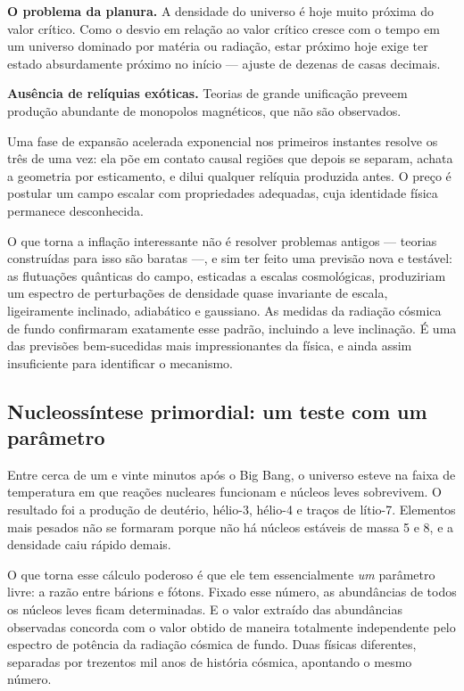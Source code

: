 \documentclass[11pt,a4paper]{article}
\begin{document}
\textbf{O problema da planura.} A densidade do universo é hoje muito próxima do valor crítico. Como o desvio em relação ao valor crítico cresce com o tempo em um universo dominado por matéria ou radiação, estar próximo hoje exige ter estado absurdamente próximo no início --- ajuste de dezenas de casas decimais.

\textbf{Ausência de relíquias exóticas.} Teorias de grande unificação preveem produção abundante de monopolos magnéticos, que não são observados.

Uma fase de expansão acelerada exponencial nos primeiros instantes resolve os três de uma vez: ela põe em contato causal regiões que depois se separam, achata a geometria por esticamento, e dilui qualquer relíquia produzida antes. O preço é postular um campo escalar com propriedades adequadas, cuja identidade física permanece desconhecida.

O que torna a inflação interessante não é resolver problemas antigos --- teorias construídas para isso são baratas ---, e sim ter feito uma previsão nova e testável: as flutuações quânticas do campo, esticadas a escalas cosmológicas, produziriam um espectro de perturbações de densidade quase invariante de escala, ligeiramente inclinado, adiabático e gaussiano. As medidas da radiação cósmica de fundo confirmaram exatamente esse padrão, incluindo a leve inclinação. É uma das previsões bem-sucedidas mais impressionantes da física, e ainda assim insuficiente para identificar o mecanismo.

\subsection*{Nucleossíntese primordial: um teste com um parâmetro}

Entre cerca de um e vinte minutos após o Big Bang, o universo esteve na faixa de temperatura em que reações nucleares funcionam e núcleos leves sobrevivem. O resultado foi a produção de deutério, hélio-3, hélio-4 e traços de lítio-7. Elementos mais pesados não se formaram porque não há núcleos estáveis de massa 5 e 8, e a densidade caiu rápido demais.

O que torna esse cálculo poderoso é que ele tem essencialmente \emph{um} parâmetro livre: a razão entre bárions e fótons. Fixado esse número, as abundâncias de todos os núcleos leves ficam determinadas. E o valor extraído das abundâncias observadas concorda com o valor obtido de maneira totalmente independente pelo espectro de potência da radiação cósmica de fundo. Duas físicas diferentes, separadas por trezentos mil anos de história cósmica, apontando o mesmo número.
\end{document}
